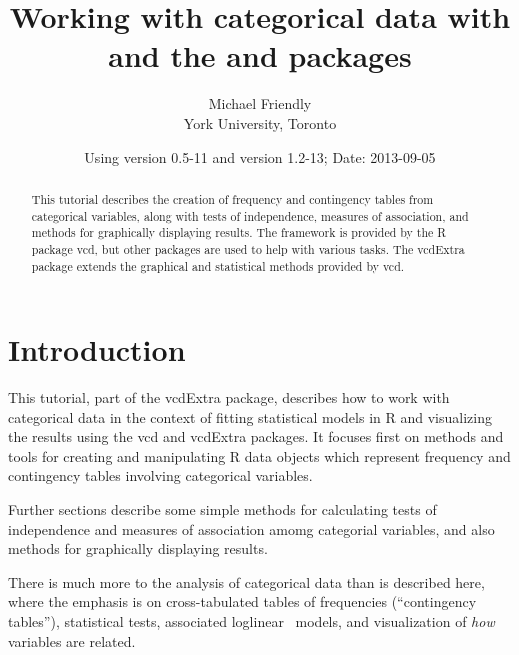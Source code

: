 \documentclass[10pt,twoside]{article}\usepackage[]{graphicx}\usepackage[]{color}
\author{Michael Friendly\\York University, Toronto}
\title{Working with categorical data with \proglang{R} and the \pkg{vcd} and \pkg{vcdExtra} packages}
\date{\footnotesize{Using \Rpackage{vcdExtra} version 0.5-11
  and \Rpackage{vcd} version 1.2-13; Date: 2013-09-05}}
\newcommand{\loglin}{loglinear }
\let\proglang=\textsf
\newcommand{\pkg}[1]{{\normalfont\fontseries{b}\selectfont #1}}
\begin{document}
\maketitle

\begin{abstract}
This tutorial describes the creation of frequency and contingency tables
from categorical variables, along with tests of independence, measures
of association, and methods for graphically displaying results. 
The framework is provided by the \proglang{R} package \pkg{vcd},
but other packages are used to help with various tasks.  
The \pkg{vcdExtra} package extends the graphical and statistical methods provided by
\pkg{vcd}.
\end{abstract}


{\small
 \tableofcontents
}


\section[Introduction]{Introduction}\label{sec:intro}


This tutorial, part of the \pkg{vcdExtra} package,
describes how to work with categorical data in the context of
fitting statistical models in \proglang{R} and visualizing
the results using the \pkg{vcd} and \pkg{vcdExtra} packages.
It focuses first on methods and tools for creating
and manipulating \proglang{R} data objects which represent
frequency and contingency tables involving
categorical variables.

Further sections describe some simple methods for calculating 
tests of independence and measures of association amomg 
categorial variables, and also
methods for graphically displaying results.

There is much more to the analysis of categorical data than is described here,
where the emphasis is on cross-tabulated tables of frequencies (``contingency tables''),
statistical tests, associated \loglin\ models, and visualization of \emph{how}
variables are related.
\end{document}
